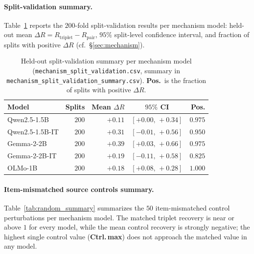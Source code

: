 \documentclass[11pt]{article}
\begin{document}
\paragraph{Split-validation summary.}
Table~\ref{tab:split_summary} reports the $200$-fold split-validation results per mechanism
model: held-out mean $\Delta R = R_{\text{triplet}} - R_{\text{pair}}$, $95\%$ split-level
confidence interval, and fraction of splits with positive $\Delta R$ (cf.\ \S\ref{sec:mechanism}).

\begin{table}[H]
\centering
\scriptsize
\setlength{\tabcolsep}{2pt}
\begin{tabular*}{\columnwidth}{@{\extracolsep{\fill}}lrrcr@{}}
\toprule
Model & Splits & Mean $\Delta R$ & $95\%$ CI & Pos. \\
\midrule
Qwen2.5-1.5B    & $200$ & $+0.11$ & $[+0.00,\,+0.34]$ & $0.975$ \\
Qwen2.5-1.5B-IT & $200$ & $+0.31$ & $[-0.01,\,+0.56]$ & $0.950$ \\
Gemma-2-2B      & $200$ & $+0.39$ & $[+0.03,\,+0.66]$ & $0.975$ \\
Gemma-2-2B-IT   & $200$ & $+0.19$ & $[-0.11,\,+0.58]$ & $0.825$ \\
OLMo-1B         & $200$ & $+0.18$ & $[+0.08,\,+0.28]$ & $1.000$ \\
\bottomrule
\end{tabular*}
\caption{Held-out split-validation summary per mechanism model
(\texttt{mechanism\_split\_validation.csv}, summary in
\texttt{mechanism\_split\_validation\_\allowbreak summary.csv}). \textbf{Pos.}\ is the fraction
of splits with positive $\Delta R$.}
\label{tab:split_summary}
\end{table}

\paragraph{Item-mismatched source controls summary.}
Table~\ref{tab:random_summary} summarizes the $50$ item-mismatched control perturbations per
mechanism model. The matched triplet recovery is near or above $1$ for every model, while
the mean control recovery is strongly negative; the highest single control value
(\textbf{Ctrl.\,max}) does not approach the matched value in any model.
\end{document}
